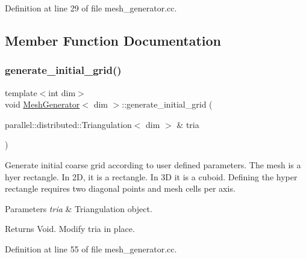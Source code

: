 Definition at line 29 of file mesh\+\_\+generator.\+cc.



\subsection{Member Function Documentation}
\mbox{\label{class_mesh_generator_a57b433e53fa1b80670a76a1e0c898963}} 
\subsubsection{\texorpdfstring{generate\+\_\+initial\+\_\+grid()}{generate\_initial\_grid()}}
{\footnotesize\ttfamily template$<$int dim$>$ \\
void \hyperlink{class_mesh_generator}{Mesh\+Generator}$<$ dim $>$\+::generate\+\_\+initial\+\_\+grid (\begin{DoxyParamCaption}\item[{parallel\+::distributed\+::\+Triangulation$<$ dim $>$ \&}]{tria }\end{DoxyParamCaption})\hspace{0.3cm}{\ttfamily [private]}}

Generate initial coarse grid according to user defined parameters. The mesh is a hyer rectangle. In 2D, it is a rectangle. In 3D it is a cuboid. Defining the hyper rectangle requires two diagonal points and mesh cells per axis.


\begin{DoxyParams}{Parameters}
{\em tria} & Triangulation object. \\
\hline
\end{DoxyParams}
\begin{DoxyReturn}{Returns}
Void. Modify tria in place. 
\end{DoxyReturn}


Definition at line 55 of file mesh\+\_\+generator.\+cc.

\mbox{\label{class_mesh_generator_a9b3414fd31d1d06b0cc4a0c345bc6542}} 
